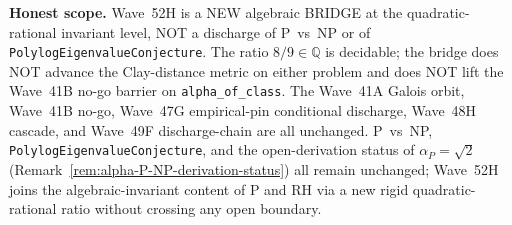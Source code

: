 \begin{remark}
\textbf{Honest scope.} Wave~52H is a NEW algebraic BRIDGE at the quadratic-rational invariant level, NOT a discharge of P~vs~NP or of \texttt{PolylogEigenvalueConjecture}. The ratio $8/9 \in \mathbb{Q}$ is decidable; the bridge does NOT advance the Clay-distance metric on either problem and does NOT lift the Wave~41B no-go barrier on \texttt{alpha\_of\_class}. The Wave~41A Galois orbit, Wave~41B no-go, Wave~47G empirical-pin conditional discharge, Wave~48H cascade, and Wave~49F discharge-chain are all unchanged. P~vs~NP, \texttt{PolylogEigenvalueConjecture}, and the open-derivation status of $\alpha_P = \sqrt{2}$ (Remark~\ref{rem:alpha-P-NP-derivation-status}) all remain unchanged; Wave~52H joins the algebraic-invariant content of P and RH via a new rigid quadratic-rational ratio without crossing any open boundary.
\end{remark}

